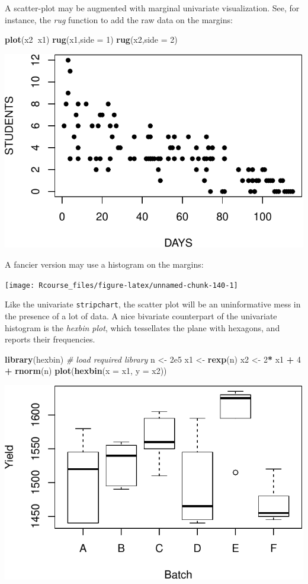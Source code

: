 \documentclass[]{book}
\newenvironment{Shaded}{\begin{snugshade}}{\end{snugshade}}
\newcommand{\CommentTok}[1]{\textcolor[rgb]{0.56,0.35,0.01}{\textit{#1}}}
\newcommand{\DataTypeTok}[1]{\textcolor[rgb]{0.13,0.29,0.53}{#1}}
\newcommand{\DecValTok}[1]{\textcolor[rgb]{0.00,0.00,0.81}{#1}}
\newcommand{\FloatTok}[1]{\textcolor[rgb]{0.00,0.00,0.81}{#1}}
\newcommand{\KeywordTok}[1]{\textcolor[rgb]{0.13,0.29,0.53}{\textbf{#1}}}
\newcommand{\NormalTok}[1]{#1}
\newcommand{\OperatorTok}[1]{\textcolor[rgb]{0.81,0.36,0.00}{\textbf{#1}}}
\newcommand{\StringTok}[1]{\textcolor[rgb]{0.31,0.60,0.02}{#1}}
\theoremstyle{definition}
\theoremstyle{definition}
\theoremstyle{definition}
\theoremstyle{remark}
\begin{document}
A scatter-plot may be augmented with marginal univariate visualization.
See, for instance, the \emph{rug} function to add the raw data on the margins:

\begin{Shaded}
\begin{Highlighting}[]
\KeywordTok{plot}\NormalTok{(x2}\OperatorTok{~}\NormalTok{x1)}
\KeywordTok{rug}\NormalTok{(x1,}\DataTypeTok{side =} \DecValTok{1}\NormalTok{)}
\KeywordTok{rug}\NormalTok{(x2,}\DataTypeTok{side =} \DecValTok{2}\NormalTok{)}
\end{Highlighting}
\end{Shaded}

\includegraphics[width=0.5\linewidth]{Rcourse_files/figure-latex/unnamed-chunk-139-1}

A fancier version may use a histogram on the margins:

\texttt{[image: Rcourse\_files/figure-latex/unnamed-chunk-140-1]}

Like the univariate \texttt{stripchart}, the scatter plot will be an uninformative mess in the presence of a lot of data.
A nice bivariate counterpart of the univariate histogram is the \emph{hexbin plot}, which tessellates the plane with hexagons, and reports their frequencies.

\begin{Shaded}
\begin{Highlighting}[]
\KeywordTok{library}\NormalTok{(hexbin) }\CommentTok{# load required library}
\NormalTok{n <-}\StringTok{ }\FloatTok{2e5}
\NormalTok{x1 <-}\StringTok{ }\KeywordTok{rexp}\NormalTok{(n)}
\NormalTok{x2 <-}\StringTok{ }\DecValTok{2}\OperatorTok{*}\StringTok{ }\NormalTok{x1 }\OperatorTok{+}\StringTok{ }\DecValTok{4} \OperatorTok{+}\StringTok{ }\KeywordTok{rnorm}\NormalTok{(n)}
\KeywordTok{plot}\NormalTok{(}\KeywordTok{hexbin}\NormalTok{(}\DataTypeTok{x =}\NormalTok{ x1, }\DataTypeTok{y =}\NormalTok{ x2))}
\end{Highlighting}
\end{Shaded}

\includegraphics[width=0.5\linewidth]{Rcourse_files/figure-latex/unnamed-chunk-141-1}
\end{document}

